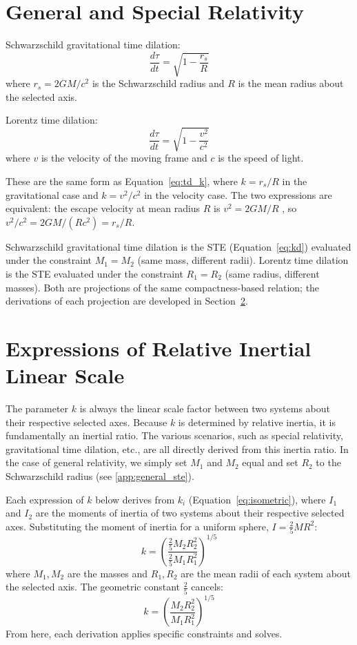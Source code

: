 \documentclass[twoside,twocolumn,9pt]{article}
\begin{document}
\section{General and Special Relativity}
Schwarzschild gravitational time dilation:
\begin{equation} \label{eq:schwarzschild}
\frac{d\tau}{dt} = \sqrt{1 - \frac{r_s}{R}}
\end{equation}
where $r_s = 2GM/c^2$ is the Schwarzschild radius and $R$ is the mean radius about the selected axis.

Lorentz time dilation:
\begin{equation} \label{eq:lorentz}
\frac{d\tau}{dt} = \sqrt{1 - \frac{v^2}{c^2}}
\end{equation}
where $v$ is the velocity of the moving frame and $c$ is the speed of light.

These are the same form as Equation~\ref{eq:td_k}, where $k = r_s/R$ in the gravitational case and $k = v^2/c^2$ in the velocity case. The two expressions are equivalent: the escape velocity at mean radius $R$ is $v^2 = 2GM/R$ \citep{goldstein2002}, so $v^2/c^2 = 2GM/(Rc^2) = r_s/R$.

Schwarzschild gravitational time dilation is the STE (Equation~\ref{eq:kd}) evaluated under the constraint $M_1 = M_2$ (same mass, different radii). Lorentz time dilation is the STE evaluated under the constraint $R_1 = R_2$ (same radius, different masses). Both are projections of the same compactness-based relation; the derivations of each projection are developed in Section~\ref{sec:expressions}.


\section{Expressions of Relative Inertial Linear Scale}\label{sec:expressions}

The parameter $k$ is always the linear scale factor between two systems about their respective selected axes. Because $k$ is determined by relative inertia, it is fundamentally an inertial ratio. The various scenarios, such as special relativity, gravitational time dilation, etc., are all directly derived from this inertia ratio. In the case of general relativity, we simply set $M_1$ and $M_2$ equal and set $R_2$ to the Schwarzschild radius (see \ref{app:general_ste}).

Each expression of $k$ below derives from $k_i$ (Equation~\ref{eq:isometric}), where $I_1$ and $I_2$ are the moments of inertia of two systems about their respective selected axes. Substituting the moment of inertia for a uniform sphere, $I = \frac{2}{5}MR^2$:
\begin{equation} \label{eq:k_expanded}
k = \left(\frac{\frac{2}{5}M_2 R_2^2}{\frac{2}{5}M_1 R_1^2}\right)^{1/5}
\end{equation}
where $M_1, M_2$ are the masses and $R_1, R_2$ are the mean radii of each system about the selected axis. The geometric constant $\frac{2}{5}$ cancels:
\begin{equation} \label{eq:k_simplified}
k = \left(\frac{M_2 R_2^2}{M_1 R_1^2}\right)^{1/5}
\end{equation}
From here, each derivation applies specific constraints and solves.
\end{document}
